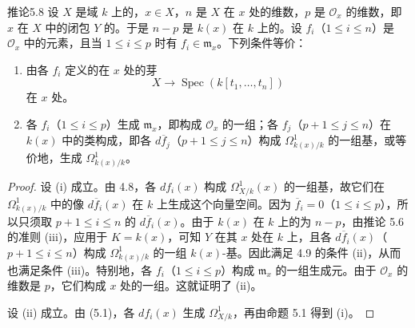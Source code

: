 \begin{SGAresult}{推论}{5.8}
设 $X$ 是域 $k$ 上的，$x\in X$，$n$ 是 $X$ 在 $x$ 处的维数，$p$ 是 $\mathcal O_x$ 的维数，即 $x$ 在 $X$ 中的闭包 $Y$ 的。于是 $n-p$ 是 $k(x)$ 在 $k$ 上的。设 $f_i$（$1\leq i\leq n$）是 $\mathcal O_x$ 中的元素，且当 $1\leq i\leq p$ 时有 $f_i\in\mathfrak m_x$。下列条件等价：
\begin{enumerate}
\item[(i)] 由各 $f_i$ 定义的在 $x$ 处的芽
\[
X\longrightarrow\operatorname{Spec}(k[t_1,\ldots,t_n])
\]
在 $x$ 处。
\item[(ii)] 各 $f_i$（$1\leq i\leq p$）生成 $\mathfrak m_x$，即构成 $\mathcal O_x$ 的一组；各 $f_j$（$p+1\leq j\leq n$）在 $k(x)$ 中的类构成，即各 $d\overline f_j$（$p+1\leq j\leq n$）构成 $\Omega^1_{k(x)/k}$ 的一组基，或等价地，生成 $\Omega^1_{k(x)/k}$。
\end{enumerate}
\end{SGAresult}
\begin{proof}
设 (i) 成立。由 4.8，各 $df_i(x)$ 构成 $\Omega^1_{X/k}(x)$ 的一组基，故它们在 $\Omega^1_{k(x)/k}$ 中的像 $d\overline f_i(x)$ 在 $k$ 上生成这个向量空间。因为 $\overline f_i=0$（$1\leq i\leq p$），所以只须取 $p+1\leq i\leq n$ 的 $d\overline f_i(x)$。由于 $k(x)$ 在 $k$ 上的为 $n-p$，由推论 5.6 的准则 (iii)，应用于 $K=k(x)$，可知 $Y$ 在其 $x$ 处在 $k$ 上，且各 $d\overline f_i(x)$（$p+1\leq i\leq n$）构成 $\Omega^1_{k(x)/k}$ 的一组 $k(x)$-基。因此满足 4.9 的条件 (ii)，从而也满足条件 (iii)。特别地，各 $f_i$（$1\leq i\leq p$）构成 $\mathfrak m_x$ 的一组生成元。由于 $\mathcal O_x$ 的维数是 $p$，它们构成 $x$ 处的一组。这就证明了 (ii)。

设 (ii) 成立。由 (5.1)，各 $df_i(x)$ 生成 $\Omega^1_{X/k}$，再由命题 5.1 得到 (i)。
\end{proof}

